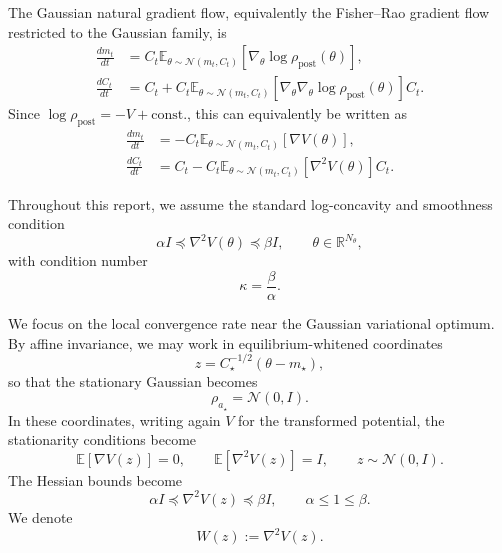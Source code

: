 \documentclass[11pt]{article}
\numberwithin{equation}{section}
\begin{document}
The Gaussian natural gradient flow, equivalently the Fisher--Rao gradient flow restricted to the Gaussian family, is
\begin{align}
    \frac{d m_t}{dt}
    &=
    C_t
    \mathbb E_{\theta\sim \mathcal N(m_t,C_t)}
    [
    \nabla_\theta \log \rho_{\mathrm{post}}(\theta)
    ],
    \\
    \frac{d C_t}{dt}
    &=
    C_t
    +
    C_t
    \mathbb E_{\theta\sim \mathcal N(m_t,C_t)}
    [
    \nabla_\theta\nabla_\theta \log \rho_{\mathrm{post}}(\theta)
    ]
    C_t.
\end{align}
Since $\log \rho_{\mathrm{post}}=-V+\mathrm{const.}$, this can equivalently be written as
\begin{align}
    \frac{d m_t}{dt}
    &=
    -
    C_t
    \mathbb E_{\theta\sim \mathcal N(m_t,C_t)}
    [
    \nabla V(\theta)
    ],
    \\
    \frac{d C_t}{dt}
    &=
    C_t
    -
    C_t
    \mathbb E_{\theta\sim \mathcal N(m_t,C_t)}
    [
    \nabla^2 V(\theta)
    ]
    C_t.
\end{align}

Throughout this report, we assume the standard log-concavity and smoothness condition
\begin{equation}
    \alpha I
    \preceq
    \nabla^2 V(\theta)
    \preceq
    \beta I,
    \qquad
    \theta\in\mathbb R^{N_\theta},
\end{equation}
with condition number
\begin{equation}
    \kappa=\frac{\beta}{\alpha}.
\end{equation}

We focus on the local convergence rate near the Gaussian variational optimum. 
By affine invariance, we may work in equilibrium-whitened coordinates
\begin{equation}
    z=C_\star^{-1/2}(\theta-m_\star),
\end{equation}
so that the stationary Gaussian becomes
\begin{equation}
    \rho_{a_\star}=\mathcal N(0,I).
\end{equation}
In these coordinates, writing again $V$ for the transformed potential, the stationarity conditions become
\begin{equation}
    \mathbb E[\nabla V(z)] = 0,
    \qquad
    \mathbb E[\nabla^2 V(z)] = I,
    \qquad
    z\sim \mathcal N(0,I).
\end{equation}
The Hessian bounds become
\begin{equation}
    \alpha I
    \preceq
    \nabla^2 V(z)
    \preceq
    \beta I,
    \qquad
    \alpha\le 1\le \beta.
\end{equation}
We denote
\begin{equation}
    W(z):=\nabla^2 V(z).
\end{equation}
\end{document}
